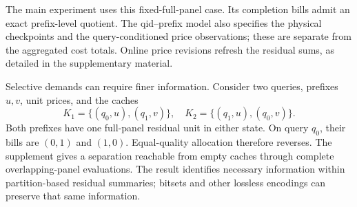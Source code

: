 The main experiment uses this fixed-full-panel case. Its completion bills admit
an exact prefix-level quotient. The qid--prefix model also specifies the physical
checkpoints and the query-conditioned price observations; these are separate
from the aggregated cost totals. Online price revisions refresh the residual
sums, as detailed in the supplementary material.

Selective demands can require finer information. Consider two queries, prefixes
$u,v$, unit prices, and the caches
\[
 K_1=\{(q_0,u),(q_1,v)\},\quad
 K_2=\{(q_1,u),(q_0,v)\}.
\]
Both prefixes have one full-panel residual unit in either state.
On query $q_0$, their bills are $(0,1)$ and $(1,0)$. Equal-quality allocation
therefore reverses. The supplement gives a separation reachable from empty
caches through complete overlapping-panel evaluations. The result identifies
necessary information within partition-based residual summaries; bitsets and
other lossless encodings can preserve that same information.
